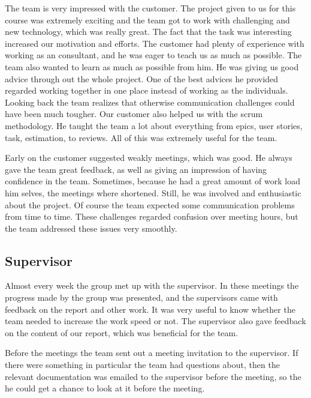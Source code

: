The team is very impressed with the customer. The project given to us for this course was extremely exciting and the team got to work with challenging and new technology, which was really great. The fact that the task was interesting increased our motivation and efforts. The customer had plenty of experience with working as an consultant, and he was eager to teach us as much as possible. The team also wanted to learn as much as possible from him. He was giving us good advice through out the whole project. One of the best advices he provided regarded working together in one place instead of working as the individuals. Looking back the team realizes that otherwise communication challenges could have been much tougher. Our customer also helped us with the scrum methodology. He taught the team a lot about everything from epics, user stories, task, estimation, to reviews. All of this was extremely useful for the team.

Early on the customer suggested weakly meetings, which was good. He always gave the team great feedback, as well as giving an impression of having confidence in the team. Sometimes, because he had a great amount of work load him selves, the meetings where shortened. Still, he was involved and enthusiastic about the project. Of course the team expected some communication problems from time to time. These challenges regarded confusion over meeting hours, but the team addressed these issues very smoothly. 

\subsection{Supervisor}
Almost every week the group met up with the supervisor. In these meetings the progress made by the group was presented, and the supervisors came with feedback on the report and other work. It was very useful to know whether the team needed to increase the work speed or not. 
The supervisor also gave feedback on the content of our report, which was beneficial for the team.

Before the meetings the team sent out a meeting invitation to the supervisor.
If there were something in particular the team had questions about, then the relevant documentation was emailed to the supervisor before the meeting, so the he could get a chance to look at it before the meeting.

